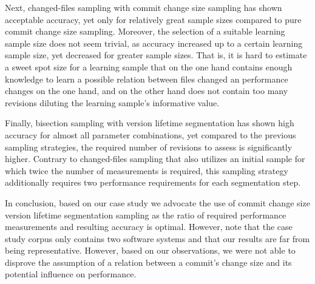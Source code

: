 Next, changed-files sampling with commit change size sampling has shown
acceptable accuracy, yet only for relatively great sample sizes compared to
pure commit change size sampling. Moreover, the selection of a suitable
learning sample size does not seem trivial, as accuracy increased up to a
certain learning sample size, yet decreased for greater sample sizes. That is,
it is hard to estimate a sweet spot size for a learning sample that on the one
hand contains enough knowledge to learn a possible relation between files
changed an performance changes on the one hand, and on the other hand does not
contain too many revisions diluting the learning sample's informative value. 

Finally, bisection sampling with version lifetime segmentation has shown high
accuracy for almost all parameter combinations, yet compared to the previous
sampling strategies, the required number of revisions to assess is
significantly higher. Contrary to changed-files sampling that also utilizes an
initial sample for which twice the number of measurements is required, this
sampling strategy additionally requires two performance requirements for each
segmentation step.

In conclusion, based on our case study we advocate the use of commit change
size version lifetime segmentation sampling as the ratio of required performance
measurements and resulting accuracy is optimal. However, note that the case study corpus only contains two
software systems and that our results are far from being representative.
However, based on our observations, we were not able to disprove the assumption
of a relation between a commit’s change size and its potential influence on performance.
